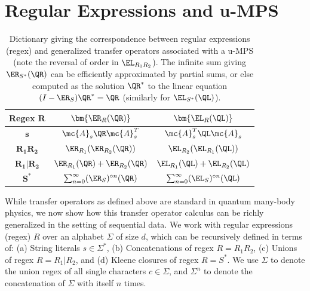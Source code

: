 \section{Regular Expressions and u-MPS}
\label{sec:regex}
%
\begin{table}[t]
\setlength\aboverulesep{0.1pt}
\setlength\belowrulesep{0.1pt}
\renewcommand{\arraystretch}{1.7}
\caption{Dictionary giving the correspondence between regular expressions (regex) and generalized transfer operators associated with a u-MPS (note the reversal of order in $\EL_{R_1 R_2}$). The infinite sum giving $\ER_{S^*}(\QR)$ can be efficiently approximated by partial sums, or else computed as the solution $\QR^*$ to the linear equation $(I - \ER_S)\QR^* = \QR$ (similarly for $\EL_{S^*}(\QL)$).}
\label{tab:regex_cp}
\begin{center}
\begin{small}
\begin{sc}
\begin{tabular}{c|c|c}
    \textbf{Regex} $\mathbf{R}$ & $\bm{\ER_R(\QR)}$ & $\bm{\EL_R(\QL)}$ \\
    \midrule
    $\mathbf{s}$ &         $\mc{A}_s \QR \mc{A}_s^T$                             & $\mc{A}_s^T \QL \mc{A}_s$ \\
    $\mathbf{R_1 R_2}$ &   $\ER_{R_1}(\ER_{R_2}(\QR))$                           & $\EL_{R_2}(\EL_{R_1}(\QL))$ \\
    $\mathbf{R_1 | R_2}$ & $\ER_{R_1}(\QR) + \ER_{R_2}(\QR)$                     & $\EL_{R_1}(\QL) + \EL_{R_2}(\QL)$ \\
    $\mathbf{S^*}$ &       $\sum_{n=0}^\infty (\ER_S)^{\circ n}(\QR)$ & $\sum_{n=0}^\infty (\EL_S)^{\circ n}(\QL)$ 
\end{tabular}
\end{sc}
\end{small}
\end{center}
\vskip -0.1in
\end{table}
%
While transfer operators as defined above are standard in quantum many-body physics, we now show how this transfer operator calculus can be richly generalized in the setting of sequential data. We work with regular expressions (regex) $R$ over an alphabet $\Sigma$ of size $d$, which can be recursively defined in terms of: (a) String literals $s\in\Sigma^*$, (b) Concatenations of regex $R = R_1 R_2$, (c) Unions of regex $R = R_1 | R_2$, and (d) Kleene closures of regex $R = S^*$. We use $\Sigma$ to denote the union regex of all single characters $c \in \Sigma$, and $\Sigma^n$ to denote the concatenation of $\Sigma$ with itself $n$ times.

